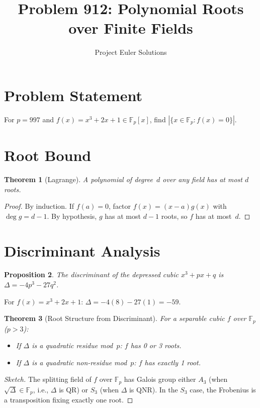 \documentclass[11pt]{article}
\title{Problem 912: Polynomial Roots over Finite Fields}
\author{Project Euler Solutions}
\date{}
\newtheorem{theorem}{Theorem}
\newtheorem{proposition}[theorem]{Proposition}
\begin{document}
\maketitle

\section{Problem Statement}

For $p = 997$ and $f(x) = x^3 + 2x + 1 \in \mathbb{F}_p[x]$, find $|\{x \in \mathbb{F}_p : f(x) = 0\}|$.

\section{Root Bound}

\begin{theorem}[Lagrange]
A polynomial of degree~$d$ over any field has at most $d$ roots.
\end{theorem}

\begin{proof}
By induction. If $f(a) = 0$, factor $f(x) = (x-a)g(x)$ with $\deg g = d-1$. By hypothesis, $g$ has at most $d-1$ roots, so $f$ has at most~$d$.
\end{proof}

\section{Discriminant Analysis}

\begin{proposition}
The discriminant of the depressed cubic $x^3 + px + q$ is $\Delta = -4p^3 - 27q^2$.
\end{proposition}

For $f(x) = x^3 + 2x + 1$: $\Delta = -4(8) - 27(1) = -59$.

\begin{theorem}[Root Structure from Discriminant]
For a separable cubic $f$ over $\mathbb{F}_p$ ($p > 3$):
\begin{itemize}
\item If $\Delta$ is a quadratic residue mod~$p$: $f$ has 0 or 3 roots.
\item If $\Delta$ is a quadratic non-residue mod~$p$: $f$ has exactly 1 root.
\end{itemize}
\end{theorem}

\begin{proof}[Sketch]
The splitting field of $f$ over $\mathbb{F}_p$ has Galois group either $A_3$ (when $\sqrt{\Delta} \in \mathbb{F}_p$, i.e., $\Delta$ is QR) or $S_3$ (when $\Delta$ is QNR). In the $S_3$ case, the Frobenius is a transposition fixing exactly one root.
\end{proof}
\end{document}

